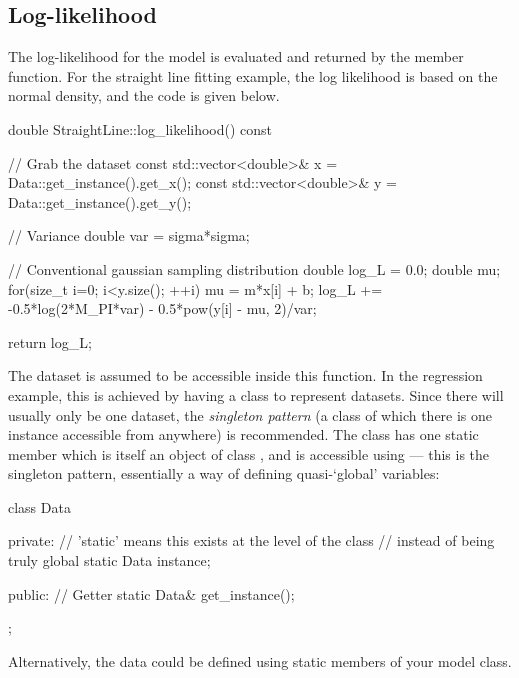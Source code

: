 \documentclass[article, nojss]{jss}
\begin{document}
\subsection{Log-likelihood}
The log-likelihood for the model is evaluated and returned by the
 member function. For the straight line
fitting example, the log likelihood is based on the
normal density, and the code is given below.
\begin{CodeChunk}
\begin{CodeInput}
double StraightLine::log_likelihood() const
{
    // Grab the dataset
    const std::vector<double>& x = Data::get_instance().get_x();
    const std::vector<double>& y = Data::get_instance().get_y();

    // Variance
    double var = sigma*sigma;

    // Conventional gaussian sampling distribution
    double log_L = 0.0;
    double mu;
    for(size_t i=0; i<y.size(); ++i)
    {
        mu = m*x[i] + b;
        log_L += -0.5*log(2*M_PI*var) - 0.5*pow(y[i] - mu, 2)/var;
    }

    return log_L;
}
\end{CodeInput}
\end{CodeChunk}
The dataset is assumed to be accessible inside this function. In the
regression example, this is achieved by having a
 class to represent
datasets. Since there will usually only be one dataset,
the {\em singleton pattern} (a class of which there is one instance
accessible from anywhere) is recommended.
The  class has
one static member which is itself an object of class , and is
accessible using  --- this is the singleton pattern,
essentially a way of defining quasi-`global' variables:

\begin{CodeChunk}
\begin{CodeInput}
class Data
{
    private:
        // 'static' means this exists at the level of the class
        // instead of being truly global
        static Data instance;

    public:
        // Getter
        static Data& get_instance();
};
\end{CodeInput}
\end{CodeChunk}

Alternatively, the data could be defined using static members of your
model class.
\end{document}
